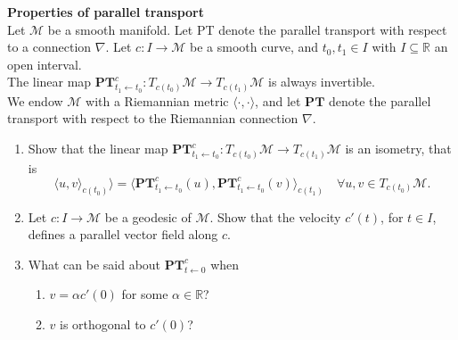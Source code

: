 \documentclass[en, oneside]{assignment}
\begin{document}
\begin{prob} \textbf{Properties of parallel transport}\\
    Let $\mathcal{M}$ be a smooth manifold. Let PT denote the parallel transport with respect to a connection $\nabla$.
    Let $c: I \rightarrow \mathcal{M}$ be a smooth curve, and $t_0, t_1 \in I$ with $I \subseteq \mathbb{R}$ an open interval.\\
    The linear map $\mathbf{P} \mathbf{T}^c_{t_1 \leftarrow t_0}: T_{c(t_0)} \mathcal{M} \rightarrow T_{c(t_1)} \mathcal{M}$ is always invertible.\\
    We endow $\mathcal{M}$ with a Riemannian metric $\langle \cdot, \cdot \rangle$, 
    and let $\mathbf{P} \mathbf{T}$ denote the parallel transport with respect to the Riemannian connection $\nabla$.
    \begin{enumerate}[label=(\arabic*)]
        \item Show that the linear map $\mathbf{P} \mathbf{T}^c_{t_1 \leftarrow t_0}: T_{c(t_0)} \mathcal{M} \rightarrow T_{c(t_1)} \mathcal{M}$ is an isometry,
        that is
        \begin{equation*}
            \langle u, v \rangle_{c(t_0)} \rangle = 
            \langle \mathbf{P} \mathbf{T}^c_{t_1 \leftarrow t_0} (u), \mathbf{P} \mathbf{T}^c_{t_1 \leftarrow t_0} (v) \rangle _{c(t_1)}
            \quad \forall u, v \in T_{c(t_0)} \mathcal{M}.
        \end{equation*}
        \item Let $c: I \rightarrow \mathcal{M}$ be a geodesic of $\mathcal{M}$. 
        Show that the velocity $c'(t)$, for $t \in I$, defines a parallel vector field along $c$.
        \item What can be said about $\mathbf{P} \mathbf{T}^c_{t \leftarrow 0}$ when
        \begin{enumerate}[label=(\alph*)]
            \item $v = \alpha c'(0)$ for some $\alpha \in \mathbb{R}$?
            \item $v$ is orthogonal to $c'(0)$?
        \end{enumerate}
    \end{enumerate}
\end{prob}
\end{document}
